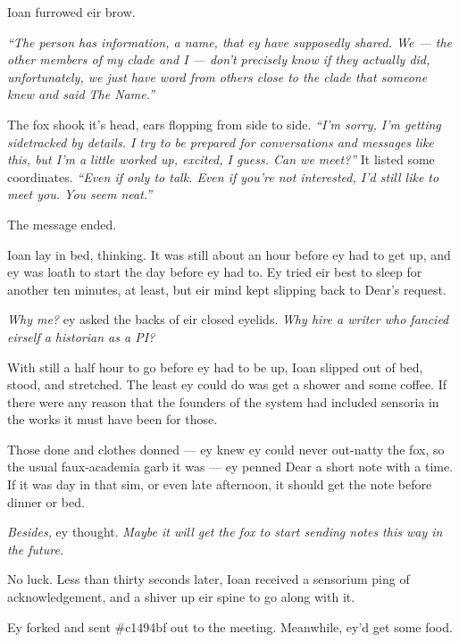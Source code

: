 Ioan furrowed eir brow.

\emph{``The person has information, a name, that ey have supposedly shared. We --- the other members of my clade and I --- don't precisely know if they actually did, unfortunately, we just have word from others close to the clade that someone knew and said The Name.''}

The fox shook it's head, ears flopping from side to side. \emph{``I'm sorry, I'm getting sidetracked by details. I try to be prepared for conversations and messages like this, but I'm a little worked up, excited, I guess. Can we meet?''} It listed some coordinates. \emph{``Even if only to talk. Even if you're not interested, I'd still like to meet you. You seem neat.''}

The message ended.

Ioan lay in bed, thinking. It was still about an hour before ey had to get up, and ey was loath to start the day before ey had to. Ey tried eir best to sleep for another ten minutes, at least, but eir mind kept slipping back to Dear's request.

\emph{Why me?} ey asked the backs of eir closed eyelids. \emph{Why hire a writer who fancied eirself a historian as a PI?}

With still a half hour to go before ey had to be up, Ioan slipped out of bed, stood, and stretched. The least ey could do was get a shower and some coffee. If there were any reason that the founders of the system had included sensoria in the works it must have been for those.

Those done and clothes donned --- ey knew ey could never out-natty the fox, so the usual faux-academia garb it was --- ey penned Dear a short note with a time. If it was day in that sim, or even late afternoon, it should get the note before dinner or bed.

\emph{Besides,} ey thought. \emph{Maybe it will get the fox to start sending notes this way in the future.}

No luck. Less than thirty seconds later, Ioan received a sensorium ping of acknowledgement, and a shiver up eir spine to go along with it.

Ey forked and sent \#c1494bf out to the meeting. Meanwhile, ey'd get some food.

